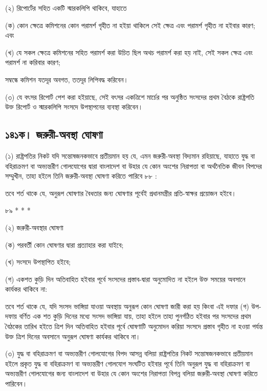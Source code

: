 \documentclass[11pt]{article}
\begin{document}
(২) রিপোর্টের সহিত একটি স্মারকলিপি থাকিবে, যাহাতে

(ক) কোন ক্ষেত্রে কমিশনের কোন পরামর্শ গৃহীত না হইয়া থাকিলে সেই ক্ষেত্র এবং
    পরামর্শ গৃহীত না হইবার কারণ; এবং

(খ) যে সকল ক্ষেত্রে কমিশনের সহিত পরামর্শ করা উচিত ছিল অথচ পরামর্শ করা হয়
    নাই, সেই সকল ক্ষেত্র এবং পরামর্শ না করিবার কারণ;

সম্বন্ধে কমিশন যতদূর অবগত, ততদূর লিপিবদ্ধ করিবেন।

(৩) যে বৎসর রিপোর্ট পেশ করা হইয়াছে, সেই বৎসর একত্রিশে মার্চের পর অনুষ্ঠিত
    সংসদের প্রথম বৈঠকে রাষ্ট্রপতি উক্ত রিপোর্ট ও স্মারকলিপি সংসদে উপস্থাপনের
    ব্যবস্থা করিবেন।

\subsection{১৪১ক। জরুরী-অবস্থা ঘোষণা}
\label{sec:orgc620780}
(১) রাষ্ট্রপতির নিকট যদি সন্তোষজনকভাবে প্রতীয়মান হয় যে, এমন জরুরী-অবস্থা
    বিদ্যমান রহিয়াছে, যাহাতে যুদ্ধ বা বহিরাক্রমণ বা অভ্যন্তরীণ গোলযোগের দ্বারা
    বাংলাদেশ বা উহার যে কোন অংশের নিরাপত্তা বা অর্থনৈতিক জীবন বিপদের
    সম্মুখীন, তাহা হইলে তিনি জরুরী-অবস্থা ঘোষণা করিতে পারিবে ৮৮ :

তবে শর্ত থাকে যে, অনুরূপ ঘোষণার বৈধতার জন্য ঘোষণার পূর্বেই প্রধানমন্ত্রীর
প্রতি-স্বাক্ষর প্রয়োজন হইবে।

৮৯ * * *

(২) জরুরী-অবস্থার ঘোষণা

(ক) পরবর্তী কোন ঘোষণার দ্বারা প্রত্যাহার করা যাইবে;

(খ) সংসদে উপস্থাপিত হইবে;

(গ) একশত কুড়ি দিন অতিবাহিত হইবার পূর্বে সংসদের প্রস্তাব-দ্বারা অনুমোদিত না
    হইলে উক্ত সময়ের অবসানে কার্যকর থাকিবে না:

তবে শর্ত থাকে যে, যদি সংসদ ভাঙ্গিয়া যাওয়া অবস্থায় অনুরূপ কোন ঘোষণা জারী করা
হয় কিংবা এই দফার (গ) উপ-দফায় বর্ণিত এক শত কুড়ি দিনের মধ্যে সংসদ ভাঙ্গিয়া
যায়, তাহা হইলে তাহা পুনর্গঠিত হইবার পর সংসদের প্রথম বৈঠকের তারিখ হইতে
ত্রিশ দিন অতিবাহিত হইবার পূর্বে ঘোষণাটি অনুমোদন করিয়া সংসদে প্রস্তাব গৃহীত না
হওয়া পর্যন্ত উক্ত ত্রিশ দিনের অবসানে অনুরূপ ঘোষণা কার্যকর থাকিবে না।

(৩) যুদ্ধ বা বহিরাক্রমণ বা অভ্যন্তরীণ গোলযোগের বিপদ আসন্ন বলিয়া রাষ্ট্রপতির
    নিকট সন্তোষজনকভাবে প্রতীয়মান হইলে প্রকৃত যুদ্ধ বা বহিরাক্রমণ বা অভ্যন্তরীণ
    গোলযোগ সংঘটিত হইবার পূর্বে তিনি অনুরূপ যুদ্ধ বা বহিরাক্রমণ বা অভ্যন্তরীণ
    গোলযোগের জন্য বাংলাদেশ বা উহার যে কোন অংশের নিরাপত্তা বিপন্ন বলিয়া
    জরুরী-অবস্থা ঘোষণা করিতে পারিবেন।
\end{document}
